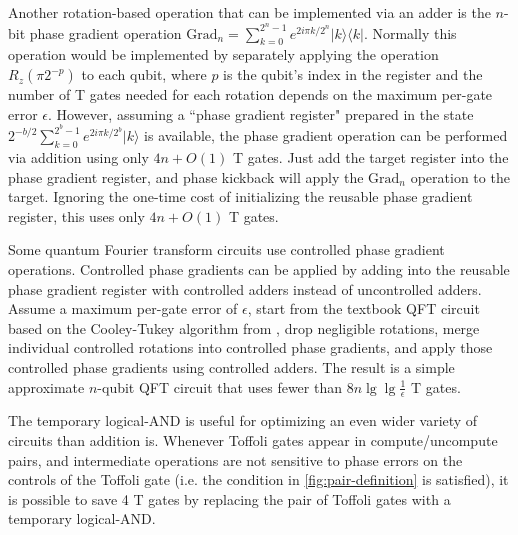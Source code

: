 \documentclass{quantumarticle-customized}
\begin{document}
Another rotation-based operation that can be implemented via an adder is the $n$-bit phase gradient operation $\text{Grad}_n = \sum_{k=0}^{2^n-1} e^{2 i \pi k / 2^n} |k\rangle \langle k|$.
Normally this operation would be implemented by separately applying the operation $R_z(\pi 2^{-p})$ to each qubit, where $p$ is the qubit's index in the register and the number of T gates needed for each rotation depends on the maximum per-gate error $\epsilon$.
However, assuming a ``phase gradient register" prepared in the state $2^{-b/2} \sum_{k=0}^{2^b-1} e^{2 i \pi k / 2^b} |k\rangle$ is available, the phase gradient operation can be performed via addition using only $4n + O(1)$ T gates.
Just add the target register into the phase gradient register, and phase kickback will apply the $\text{Grad}_n$ operation to the target.
Ignoring the one-time cost of initializing the reusable phase gradient register, this uses only $4n + O(1)$ T gates.

Some quantum Fourier transform circuits use controlled phase gradient operations.
Controlled phase gradients can be applied by adding into the reusable phase gradient register with controlled adders instead of uncontrolled adders.
Assume a maximum per-gate error of $\epsilon$, start from the textbook QFT circuit based on the Cooley-Tukey algorithm from \citep{Nielsen2009}, drop negligible rotations, merge individual controlled rotations into controlled phase gradients, and apply those controlled phase gradients using controlled adders.
The result is a simple approximate $n$-qubit QFT circuit that uses fewer than $8 n \lg \lg \frac{1}{\epsilon}$ T gates.

The temporary logical-AND is useful for optimizing an even wider variety of circuits than addition is.
Whenever Toffoli gates appear in compute/uncompute pairs, and intermediate operations are not sensitive to phase errors on the controls of the Toffoli gate (i.e. the condition in \autoref{fig:pair-definition} is satisfied), it is possible to save 4 T gates by replacing the pair of Toffoli gates with a temporary logical-AND.
\end{document}
